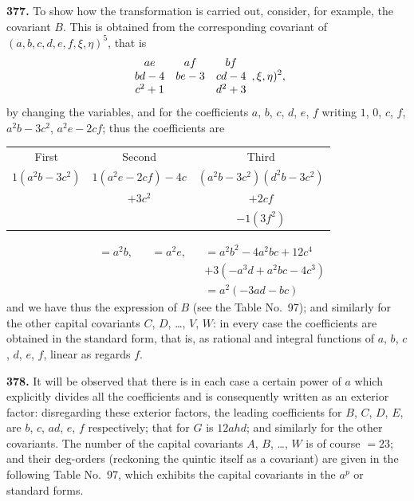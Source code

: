 \documentclass[11pt,a4paper]{book}
\providecommand{\between}{,}
\begin{document}
\noindent\textbf{377.} To show how the transformation is carried out, consider, for example, the covariant $B$. This is obtained from the corresponding covariant of $(a, b, c, d, e, f \between \xi, \eta)^5$, that is
\[
\begin{array}{c@{\quad}c@{\quad}c}
ae & af & bf \\
bd - 4 & be - 3 & cd - 4 \\
c^2 + 1 & & d^2 + 3
\end{array} \between \xi, \eta)^2,
\]
by changing the variables, and for the coefficients $a$, $b$, $c$, $d$, $e$, $f$ writing $1$, $0$, $c$, $f$, $a^2 b - 3c^2$, $a^2 e - 2cf$; thus the coefficients are
\begin{center}
\begin{tabular}{c@{\quad}c@{\quad}c}
First & Second & Third \\[2pt]
$1(a^2 b - 3c^2)$ & $1(a^2 e - 2cf) - 4c$ & $(a^2 b - 3c^2)(d^2 b - 3c^2)$ \\
& $+ 3c^2$ & $+ 2cf$ \\
& & $- 1(3f^2)$
\end{tabular}
\end{center}
\begin{align*}
&= a^2 b, &&= a^2 e, &&= a^2 b^2 - 4a^2 bc + 12c^4 \\
& && && + 3(-a^3 d + a^2 bc - 4c^3) \\
& && && = a^2(-3ad - bc)
\end{align*}
and we have thus the expression of $B$ (see the Table No.~97); and similarly for the other capital covariants $C$, $D$, \ldots, $V$, $W$: in every case the coefficients are obtained in the standard form, that is, as rational and integral functions of $a$, $b$, $c$, $d$, $e$, $f$, linear as regards $f$.

\medskip

\noindent\textbf{378.} It will be observed that there is in each case a certain power of $a$ which explicitly divides all the coefficients and is consequently written as an exterior factor: disregarding these exterior factors, the leading coefficients for $B$, $C$, $D$, $E$, are $b$, $c$, $ad$, $e$, $f$ respectively; that for $G$ is $12ahd$; and similarly for the other covariants. The number of the capital covariants $A$, $B$, \ldots, $W$ is of course $=23$; and their deg-orders (reckoning the quintic itself as a covariant) are given in the following Table No.~97, which exhibits the capital covariants in the $a^p$ or standard forms.

\medskip
\end{document}
